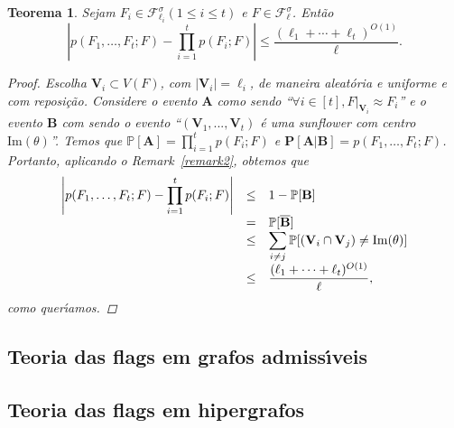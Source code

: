 \documentclass{amsart}
\theoremstyle{theorem}
\newtheorem{teorema}{Teorema}[section]
\theoremstyle{definition}
\theoremstyle{remark}
\numberwithin{equation}{section}
\begin{document}
\begin{teorema}\label{prod}
  Sejam $F_i\in\mathcal{F}^{\sigma}_{\ell_i} (1\leq i \leq t)$ e $F\in\mathcal{F}^{\sigma}_{\ell}$. Ent\~{a}o
    \begin{equation}
        \displaystyle{\left| p(F_1,\ldots,F_t;F) - \prod_{i=1}^{t} p(F_i;F) \right| \leq \frac{(\ell_1+\cdots + \ell_t)^{O(1)}}{\ell}}.
    \end{equation}

\begin{proof}
  Escolha $\mathbf{V}_i\subset V(F)$, com $|\mathbf{V}_i| = \ell_i$, de maneira aleat\'{o}ria e uniforme e com reposi\c{c}\~{a}o. Considere o evento $\mathbf{A}$ como sendo ``$\forall i\in[t], F|_{\mathbf{V}_i} \approx F_i$'' e o evento $\mathbf{B}$ com sendo o evento ``$(\mathbf{V}_1,...,\mathbf{V}_t)$ \'{e} uma sunflower com centro $\mathrm{Im}(\theta)$''. Temos que $\mathbb{P}[\mathbf{A}] = \prod_{i=1}^{t} p(F_i;F)$ e $\mathbf{P}[\mathbf{A}|\mathbf{B}] = p(F_1,\ldots,F_t;F)$. Portanto, aplicando o Remark~\ref{remark2}, obtemos que
  \begin{equation*}
    \begin{array}{rcl}
      \displaystyle{\left| p(F_1,\ldots,F_t;F) - \prod_{i=1}^{t} p(F_i;F) \right|} & \leq & 1 - \mathbb{P}[\bf{B}] \\
      & = & \mathbb{P}[\overline{\bf{B}}] \\
      & \leq & \displaystyle{\sum_{i\neq j} \mathbb{P}[(\mathbf{V}_i \cap \mathbf{V}_j) \neq \mathrm{Im}(\theta)]} \\
      & \leq & \displaystyle{\frac{(\ell_1+\cdots + \ell_t)^{O(1)}}{\ell}},
    \end{array}
  \end{equation*}
  como quer\'{\i}amos.
\end{proof}
\end{teorema}


\subsection{Teoria das flags em grafos admiss\'{\i}veis}

\subsection{Teoria das flags em hipergrafos}
\end{document}
